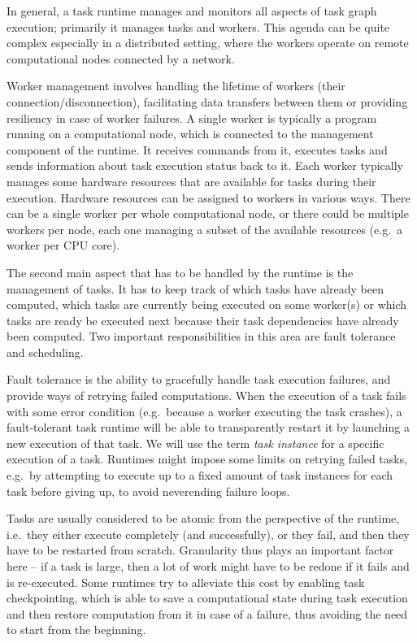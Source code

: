 In general, a task runtime manages and monitors all aspects of task graph execution; primarily it
manages tasks and workers. This agenda can be quite complex especially in a distributed setting,
where the workers operate on remote computational nodes connected by a network.

Worker management involves handling the lifetime of workers (their connection/disconnection),
facilitating data transfers between them or providing resiliency in case of worker failures. A
single worker is typically a program running on a computational node, which is connected to the
management component of the runtime. It receives commands from it, executes tasks and sends
information about task execution status back to it. Each worker typically manages some hardware
resources that are available for tasks during their execution. Hardware resources can be assigned
to workers in various ways. There can be a single worker per whole computational node, or there
could be multiple workers per node, each one managing a subset of the available resources (e.g.\ a
worker per CPU core).

The second main aspect that has to be handled by the runtime is the management of tasks. It has to
keep track of which tasks have already been computed, which tasks are currently being executed on
some worker(s) or which tasks are ready be executed next because their task dependencies have
already been computed. Two important responsibilities in this area are fault tolerance and
scheduling.

Fault tolerance is the ability to gracefully handle task execution failures, and provide ways of
retrying failed computations. When the execution of a task fails with some error condition (e.g.\
because a worker executing the task crashes), a fault-tolerant task runtime will be able to
transparently restart it by launching a new execution of that task. We will use the term
\emph{task instance} for a specific execution of a task. Runtimes might impose some limits on
retrying failed tasks, e.g.\ by attempting to execute up to a fixed amount of task instances for
each task before giving up, to avoid neverending failure loops.

Tasks are usually considered to be atomic from the perspective of the runtime, i.e.\ they either
execute completely (and successfully), or they fail, and then they have to be restarted from
scratch. Granularity thus plays an important factor here -- if a task is large, then a lot of work
might have to be redone if it fails and is re-executed. Some runtimes try to alleviate this cost by
enabling task checkpointing, which is able to save a computational state during task execution and
then restore computation from it in case of a failure, thus avoiding the need to start from the
beginning.

